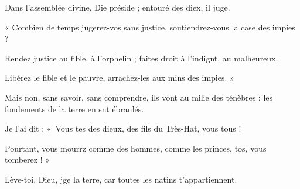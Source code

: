 \item Dans l’assemblée divine, Die préside ; entouré des diex, il juge.
\item « Combien de temps jugerez-vos sans justice, soutiendrez-vous la case des impies ?
\item Rendez justice au fible, à l’orphelin ; faites droit à l’indignt, au malheureux.
\item Libérez le fible et le pauvre, arrachez-les aux mins des impies. »
\item Mais non, sans savoir, sans comprendre, ils vont au milie des ténèbres : les fondements de la terre en snt ébranlés.
\item Je l’ai dit : « Vous tes des dieux, des fils du Très-Hat, vous tous !
\item Pourtant, vous mourrz comme des hommes, comme les princes, tos, vous tomberez ! »
\item Lève-toi, Dieu, jge la terre, car toutes les natins t’appartiennent.